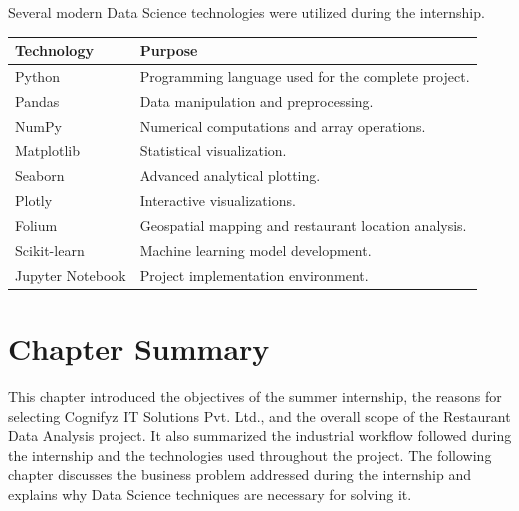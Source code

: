 \documentclass[12pt,a4paper]{report}
\begin{document}
Several modern Data Science technologies were utilized during the internship.

\begin{longtable}{|p{5cm}|p{8cm}|}

\hline
\textbf{Technology} & \textbf{Purpose} \\
\hline

Python & Programming language used for the complete project. \\
\hline

Pandas & Data manipulation and preprocessing. \\
\hline

NumPy & Numerical computations and array operations. \\
\hline

Matplotlib & Statistical visualization. \\
\hline

Seaborn & Advanced analytical plotting. \\
\hline

Plotly & Interactive visualizations. \\
\hline

Folium & Geospatial mapping and restaurant location analysis. \\
\hline

Scikit-learn & Machine learning model development. \\
\hline

Jupyter Notebook & Project implementation environment. \\
\hline

\end{longtable}


\section{Chapter Summary}

This chapter introduced the objectives of the summer internship, the reasons for selecting Cognifyz IT Solutions Pvt. Ltd., and the overall scope of the Restaurant Data Analysis project. It also summarized the industrial workflow followed during the internship and the technologies used throughout the project. The following chapter discusses the business problem addressed during the internship and explains why Data Science techniques are necessary for solving it.

\end{document}
